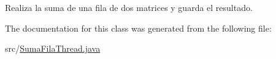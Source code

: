 Realiza la suma de una fila de dos matrices y guarda el resultado. 



The documentation for this class was generated from the following file\-:\begin{DoxyCompactItemize}
\item 
src/\hyperlink{SumaFilaThread_8java}{Suma\-Fila\-Thread.\-java}\end{DoxyCompactItemize}
